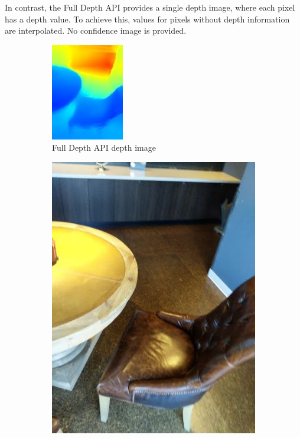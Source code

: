 In contrast, the Full Depth API provides a single depth image, where each pixel has a depth value.
To achieve this, values for pixels without depth information are interpolated.
No confidence image is provided.
\begin{figure}[ht!]
    \centering
    \begin{subfigure}[b]{0.4\textwidth}
        \centering
        \includegraphics[width=0.8\linewidth]{images/depth_full-depth-image}
        \caption{Full Depth API depth image}
    \end{subfigure}%
    \begin{subfigure}[b]{0.4\textwidth}
        \centering
        \includegraphics[width=0.8\linewidth]{images/depth_camera-image}

\end{subfigure}
\end{figure}

